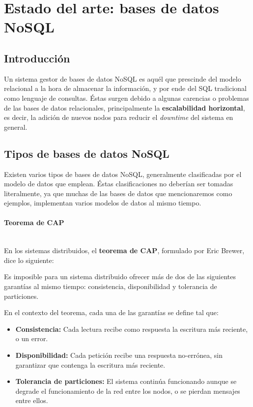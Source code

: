 \section{Estado del arte: bases de datos NoSQL}
\label{sec:state_dataScience}

\subsection{Introducción}
\label{subsec:state_dataScience_intro}

Un sistema gestor de bases de datos NoSQL es aquél que prescinde del modelo
relacional a la hora de almacenar la información, y por ende del SQL tradicional
como lenguaje de consultas. Éstas surgen debido a algunas carencias o problemas
de las bases de datos relacionales, principalmente la \textbf{escalabilidad
  horizontal}, es decir, la adición de nuevos nodos para reducir el
\emph{downtime} del sistema en general.

\subsection{Tipos de bases de datos NoSQL}
\label{subsec:state_NoSQL_types}


Existen varios tipos de bases de datos NoSQL, generalmente clasificadas por el
modelo de datos que emplean. Éstas clasificaciones no deberían ser tomadas
literalmente, ya que muchas de las bases de datos que mencionaremos como
ejemplos, implementan varios modelos de datos al mismo tiempo.

\paragraph{Teorema de CAP}
\mbox{}\\

En los sistemas distribuidos, el \textbf{teorema de CAP}, formulado por Eric
Brewer, dice lo siguiente:

\begin{capTheorem}
  Es imposible para un sistema distribuido ofrecer más de dos de las siguientes
  garantías al mismo tiempo: consistencia, disponibilidad y tolerancia de particiones.
\end{capTheorem}

En el contexto del teorema, cada una de las garantías se define tal que:

\begin{itemize}
\item \textbf{Consistencia: } Cada lectura recibe como respuesta la escritura
  más reciente, o un error.
\item \textbf{Disponibilidad: } Cada petición recibe una respuesta no-errónea,
  sin garantizar que contenga la escritura más reciente.
\item \textbf{Tolerancia de particiones: } El sistema continúa funcionando
  aunque se degrade el funcionamiento de la red entre los nodos, o se pierdan
  mensajes entre ellos.
\end{itemize}

